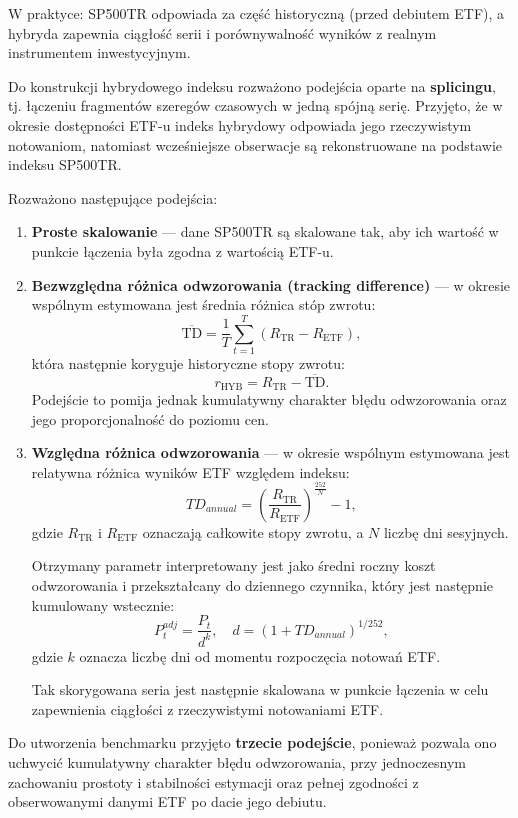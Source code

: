 \documentclass[12pt, a4paper]{article}
\begin{document}
W praktyce: SP500TR odpowiada za część historyczną (przed debiutem ETF), a hybryda zapewnia ciągłość serii i porównywalność wyników z realnym instrumentem inwestycyjnym.

Do konstrukcji hybrydowego indeksu rozważono podejścia oparte na \textbf{splicingu}, tj. łączeniu fragmentów szeregów czasowych w jedną spójną serię. Przyjęto, że w okresie dostępności ETF-u indeks hybrydowy odpowiada jego rzeczywistym notowaniom, natomiast wcześniejsze obserwacje są rekonstruowane na podstawie indeksu SP500TR.

Rozważono następujące podejścia:

\begin{enumerate}
    \item \textbf{Proste skalowanie} — dane SP500TR są skalowane tak, aby ich wartość w punkcie łączenia była zgodna z wartością ETF-u.

    \item \textbf{Bezwzględna różnica odwzorowania (tracking difference)} — w okresie wspólnym estymowana jest średnia różnica stóp zwrotu:
    \[
    \overline{\text{TD}} = \frac{1}{T}\sum_{t=1}^{T}(R_{\text{TR}} - R_{\text{ETF}}),
    \]
    która następnie koryguje historyczne stopy zwrotu:
    \[
    r_{\text{HYB}} = R_{\text{TR}} - \overline{\text{TD}}.
    \]
    Podejście to pomija jednak kumulatywny charakter błędu odwzorowania oraz jego proporcjonalność do poziomu cen.

    \item \textbf{Względna różnica odwzorowania} — w okresie wspólnym estymowana jest relatywna różnica wyników ETF względem indeksu:
    \[
    TD_{annual} = \left(\frac{R_{\text{TR}}}{R_{\text{ETF}}}\right)^{\frac{252}{N}} - 1,
    \]
    gdzie $R_{\text{TR}}$ i $R_{\text{ETF}}$ oznaczają całkowite stopy zwrotu, a $N$ liczbę dni sesyjnych.

    Otrzymany parametr interpretowany jest jako średni roczny koszt odwzorowania i przekształcany do dziennego czynnika, który jest następnie kumulowany wstecznie:
    \[
    P^{adj}_t = \frac{P_t}{d^k}, \quad d = (1 + TD_{annual})^{1/252},
    \]
    gdzie $k$ oznacza liczbę dni od momentu rozpoczęcia notowań ETF.

    Tak skorygowana seria jest następnie skalowana w punkcie łączenia w celu zapewnienia ciągłości z rzeczywistymi notowaniami ETF.
\end{enumerate}

Do utworzenia benchmarku przyjęto \textbf{trzecie podejście}, ponieważ pozwala ono uchwycić kumulatywny charakter błędu odwzorowania, przy jednoczesnym zachowaniu prostoty i stabilności estymacji oraz pełnej zgodności z obserwowanymi danymi ETF po dacie jego debiutu.
\end{document}
